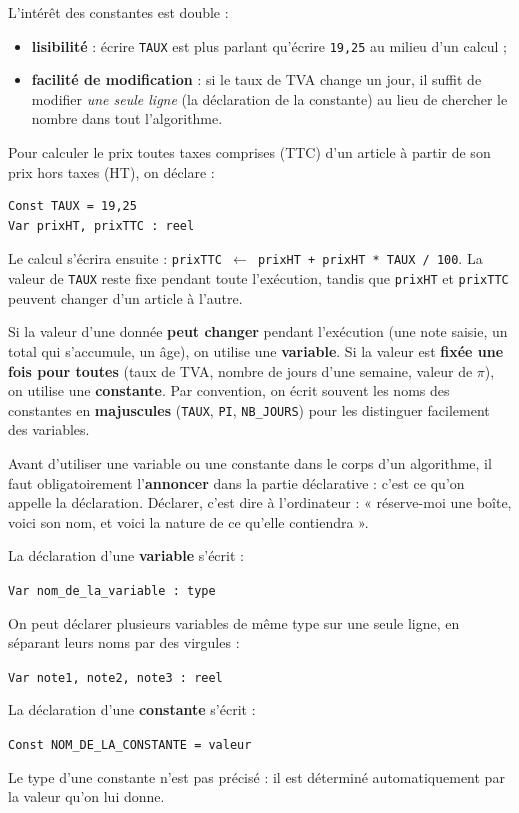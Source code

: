 \documentclass[11pt]{article}
\newcommand{\cle}[1]{{\popxbold\color{popdark}#1}}
\newcounter{popsec}
\newcounter{popsub}
\newcommand{\courssub}[1]{%
  \stepcounter{popsub}%
  \par\vspace{9pt}\noindent{\popxbold\fontsize{11.5}{13}\selectfont\color{popink}{\color{poporange}\thepopsec.\thepopsub}\hspace{6pt}#1}\par\nopagebreak\vspace{4pt}
}
\begin{document}
L'intérêt des constantes est double :

\begin{itemize}
\item \textbf{lisibilité} : écrire \texttt{TAUX} est plus parlant qu'écrire \texttt{19,25} au milieu d'un calcul ;
\item \textbf{facilité de modification} : si le taux de TVA change un jour, il suffit de modifier \emph{une seule ligne} (la déclaration de la constante) au lieu de chercher le nombre dans tout l'algorithme.
\end{itemize}

\begin{exemplebox}
Pour calculer le prix toutes taxes comprises (TTC) d'un article à partir de son prix hors taxes (HT), on déclare :
\begin{lstlisting}
Const TAUX = 19,25
Var prixHT, prixTTC : reel
\end{lstlisting}
Le calcul s'écrira ensuite : \texttt{prixTTC $\leftarrow$ prixHT + prixHT * TAUX / 100}. La valeur de \texttt{TAUX} reste fixe pendant toute l'exécution, tandis que \texttt{prixHT} et \texttt{prixTTC} peuvent changer d'un article à l'autre.
\end{exemplebox}

\begin{aretenir}
Si la valeur d'une donnée \textbf{peut changer} pendant l'exécution (une note saisie, un total qui s'accumule, un âge), on utilise une \textbf{variable}. Si la valeur est \textbf{fixée une fois pour toutes} (taux de TVA, nombre de jours d'une semaine, valeur de $\pi$), on utilise une \textbf{constante}. Par convention, on écrit souvent les noms des constantes en \textbf{majuscules} (\texttt{TAUX}, \texttt{PI}, \texttt{NB\_JOURS}) pour les distinguer facilement des variables.
\end{aretenir}

\courssub{Syntaxe de déclaration}

Avant d'utiliser une variable ou une constante dans le corps d'un algorithme, il faut obligatoirement l'\textbf{annoncer} dans la partie déclarative : c'est ce qu'on appelle la \cle{déclaration}. Déclarer, c'est dire à l'ordinateur : « réserve-moi une boîte, voici son nom, et voici la nature de ce qu'elle contiendra ».

\begin{propriete}
La déclaration d'une \textbf{variable} s'écrit :
\begin{center}
\texttt{Var nom\_de\_la\_variable : type}
\end{center}
On peut déclarer plusieurs variables de même type sur une seule ligne, en séparant leurs noms par des virgules :
\begin{center}
\texttt{Var note1, note2, note3 : reel}
\end{center}
La déclaration d'une \textbf{constante} s'écrit :
\begin{center}
\texttt{Const NOM\_DE\_LA\_CONSTANTE = valeur}
\end{center}
Le type d'une constante n'est pas précisé : il est déterminé automatiquement par la valeur qu'on lui donne.
\end{propriete}
\end{document}
